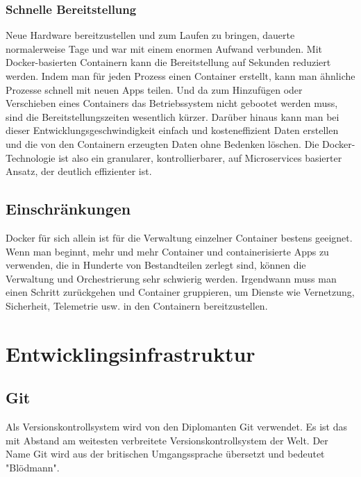 \subsubsection{Schnelle Bereitstellung}

Neue Hardware bereitzustellen und zum Laufen zu bringen, dauerte normalerweise Tage und war mit einem enormen Aufwand verbunden. Mit Docker-basierten Containern kann die Bereitstellung auf Sekunden reduziert werden. 
Indem man für jeden Prozess einen Container erstellt, kann man ähnliche Prozesse schnell mit neuen Apps teilen. Und da zum Hinzufügen oder Verschieben eines Containers das 
Betriebssystem nicht gebootet werden muss, sind die Bereitstellungszeiten wesentlich kürzer. Darüber hinaus kann man bei dieser Entwicklungsgeschwindigkeit 
einfach und kosteneffizient Daten erstellen und die von den Containern erzeugten Daten ohne Bedenken löschen.
Die Docker-Technologie ist also ein granularer, kontrollierbarer, auf Microservices basierter Ansatz, der deutlich effizienter ist.
\cite{sysarch-docker-1}

\subsection{Einschränkungen}

Docker für sich allein ist für die Verwaltung einzelner Container bestens geeignet. Wenn man beginnt, mehr und mehr Container und containerisierte Apps zu verwenden, 
die in Hunderte von Bestandteilen zerlegt sind, können die Verwaltung und Orchestrierung sehr schwierig werden. Irgendwann muss man einen Schritt zurückgehen und Container gruppieren, 
um Dienste wie Vernetzung, Sicherheit, Telemetrie usw. in den Containern bereitzustellen.
\cite{sysarch-docker-1}

\section{Entwicklingsinfrastruktur}

\subsection{Git}

Als Versionskontrollsystem wird von den Diplomanten Git verwendet.
Es ist das mit Abstand am weitesten verbreitete Versionskontrollsystem der Welt. Der Name Git wird aus der britischen 
Umgangssprache übersetzt und bedeutet "Blödmann".
\cite{sysarch-git-1}

